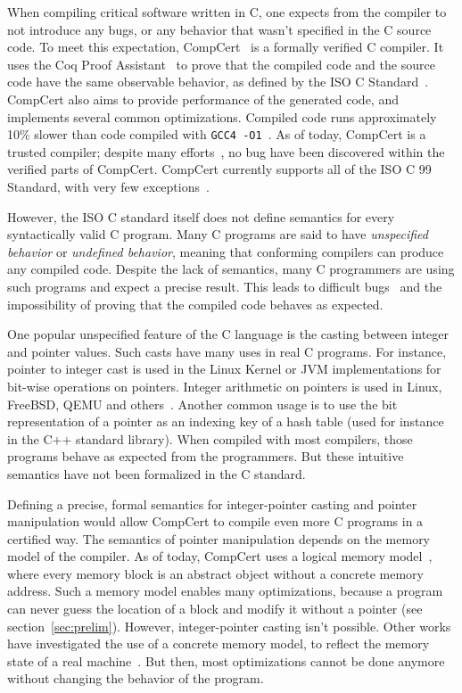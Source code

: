 When compiling critical software written in C, one expects from the compiler to not introduce any bugs, or any behavior that wasn't specified in the C source code.
To meet this expectation, CompCert~\cite{DBLP:journals/cacm/Leroy09} is a formally verified C compiler.
It uses the Coq Proof Assistant~\cite{coq} to prove that the compiled code and the source code have the same observable behavior, as defined by the ISO C Standard~\cite{iso}.
CompCert also aims to provide performance of the generated code, and implements several common optimizations. Compiled code runs approximately 10\% slower than code compiled with \texttt{GCC4 -O1}~\cite{compcertwebsite}.
As of today, CompCert is a trusted compiler; despite many efforts~\cite{DBLP:conf/pldi/YangCER11}, no bug have been discovered within the verified parts of CompCert.
CompCert currently supports all of the ISO C 99 Standard, with very few exceptions~\cite{compcertwebsite}.

However, the ISO C standard itself does not define semantics for every syntactically valid C program.
Many C programs are said to have \textit{unspecified behavior} or \textit{undefined behavior}, meaning that conforming compilers can produce any compiled code.
Despite the lack of semantics, many C programmers are using such programs and expect a precise result. %
This leads to difficult bugs~\cite{DBLP:conf/apsys/WangCCJZK12} and the impossibility of proving that the compiled code behaves as expected.

One popular unspecified feature of the C language is the casting between integer and pointer values.
Such casts have many uses in real C programs. For instance, pointer to integer cast is used in the Linux Kernel or JVM implementations for bit-wise operations on pointers. Integer arithmetic on pointers is used in Linux, FreeBSD, QEMU and others~\cite{cerberus}. Another common usage is to use the bit representation of a pointer as an indexing key of a hash table (used for instance in the C++ standard library).
When compiled with most compilers, those programs behave as expected from the programmers. But these intuitive semantics have not been formalized in the C standard.

Defining a precise, formal semantics for integer-pointer casting and pointer manipulation would allow CompCert to compile even more C programs in a certified way.
The semantics of pointer manipulation depends on the memory model of the compiler.
As of today, CompCert uses a logical memory model~\cite{leroy:hal-00703441}, where every memory block is an abstract object without a concrete memory address. Such a memory model enables many optimizations, because a program can never guess the location of a block and modify it without a pointer (see section~\ref{sec:prelim}).
However, integer-pointer casting isn't possible.
Other works have investigated the use of a concrete memory model, to reflect the memory state of a real machine~\cite{DBLP:conf/popl/TuchKN07}\cite{Norrish98cformalised}. But then, most optimizations cannot be done anymore without changing the behavior of the program.

